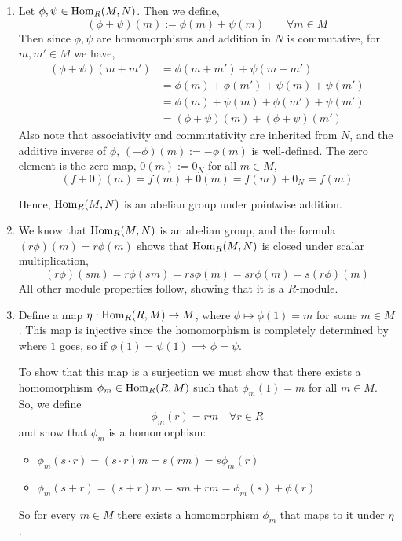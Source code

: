 \documentclass[Notebook.tex]{subfiles}
\begin{document}
    \begin{solution}
        \bbni
        \begin{enumerate}
           \item Let $\phi, \psi \in \operatorname{Hom}_R(M, N)$. Then we define, 
           \[(\phi+\psi)(m) := \phi(m) + \psi(m) \qquad \forall m \in M\]
           Then since $\phi, \psi$ are homomorphisms and addition in $N$ is commutative, for $m, m' \in M$ we have, 
           \begin{align*}
                (\phi+\psi)(m+m') &= \phi(m + m') + \psi(m + m') \\ 
                &= \phi(m) + \phi(m') + \psi(m) + \psi(m') \\ 
                &= \phi(m) + \psi(m) + \phi(m') + \psi (m') \\ 
                &= (\phi + \psi)(m) + (\phi + \psi) (m')
           \end{align*}
           Also note that associativity and commutativity are inherited from $N$, and the additive inverse of $\phi$, $(-\phi)(m) := -\phi(m)$ is well-defined. The zero element is the zero map, $0(m) := 0_N$ for all $m \in M$,
           \[(f+0)(m) = f(m) + 0(m) = f(m) + 0_N = f(m)\]
           
           Hence, $\operatorname{Hom}_R(M,N)$ is an abelian group under pointwise addition. 

           \item We know that $\operatorname{Hom}_R(M,N)$ is an abelian group, and the formula $(r\phi)(m)=r\phi(m)$ shows that $\operatorname{Hom}_R(M, N)$ is closed under scalar multiplication,
           \[(r\phi)(sm) = r\phi(sm) = rs\phi(m) = sr \phi(m) = s(r\phi)(m)\]
           All other module properties follow, showing that it is a $R$-module.

           \item Define a map $\eta: \operatorname{Hom}_R(R, M) \to M$, where $\phi \mapsto \phi(1) =m$ for some $m \in M$. This map is injective since the homomorphism is completely determined by where $1$ goes, so if $\phi(1) =\psi(1) \implies \phi = \psi$. 
           
           To show that this map is a surjection we must show that there exists a homomorphism $\phi_m \in \operatorname{Hom}_R(R, M)$ such that $\phi_m(1) = m$ for all $m \in M$. So, we define 
           \[\phi_m(r) = rm \quad \forall r \in R\]
           and show that $\phi_m$ is a homomorphism: 
           \begin{itemize}
            \item $\phi_m(s \cdot r) = (s \cdot r) m = s (rm) = s\phi_m(r)$
            \item $\phi_m(s + r) = (s + r)m = sm + rm = \phi_m(s) + \phi(r)$
           \end{itemize}
           So for every $m \in M$ there exists a homomorphism $\phi_m$ that maps to it under $\eta$. 


\end{enumerate}
\end{solution}
\end{document}
